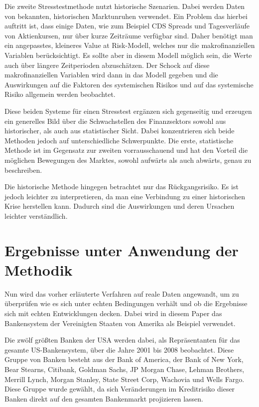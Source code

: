 \documentclass[a4paper,12pt]{scrartcl}
\begin{document}
Die zweite Stresstestmethode nutzt historische Szenarien. Dabei werden Daten von bekannten, historischen Marktunruhen verwendet. Ein Problem das hierbei auftritt ist, dass einige Daten, wie zum Beispiel CDS Spreads und Tagesverläufe von Aktienkursen, nur über kurze Zeiträume verfügbar sind. Daher benötigt man ein angepasstes, kleineres Value at Risk-Modell, welches nur die makrofinanziellen Variablen berücksichtigt. Es sollte aber in diesem Modell möglich sein, die Werte auch über längere Zeitperioden abzuschätzen.
Der Schock auf diese makrofinanziellen Variablen wird dann in das Modell gegeben und die Auswirkungen auf die Faktoren des systemischen Risikos und auf das systemische Risiko allgemein werden beobachtet.

Diese beiden Systeme für einen Stresstest ergänzen sich gegenseitig und erzeugen ein generelles Bild über die Schwachstellen des Finanzsektors sowohl aus historischer, als auch aus statistischer Sicht. Dabei konzentrieren sich beide Methoden jedoch auf unterschiedliche Schwerpunkte.
Die erste, statistische Methode ist im Gegensatz zur zweiten vorrausschauend und hat den Vorteil die möglichen Bewegungen des Marktes, sowohl aufwärts als auch abwärts, genau zu beschreiben. 

Die historische Methode hingegen betrachtet nur das Rückgangsrisiko. Es ist jedoch leichter zu interpretieren, da man eine Verbindung zu einer historischen Krise herstellen kann. Dadurch sind die Auswirkungen und deren Ursachen leichter verständlich.
\newpage

\section{Ergebnisse unter Anwendung der Methodik}
Nun wird das vorher erläuterte Verfahren auf reale Daten angewandt, um zu überprüfen wie es sich unter echten Bedingungen verhält und ob die Ergebnisse sich mit echten Entwicklungen decken. Dabei wird in diesem Paper das Bankensystem der Vereinigten Staaten von Amerika als Beispiel verwendet. 

Die zwölf größten Banken der USA werden dabei, als Repräsentanten für das gesamte US-Bankensystem, über die Jahre 2001 bis 2008 beobachtet. Diese Gruppe von Banken besteht aus der Bank of America, der Bank of New York, Bear Stearns, Citibank, Goldman Sachs, JP Morgan Chase, Lehman Brothers, Merrill Lynch, Morgan Stanley, State Street Corp, Wachovia und Wells Fargo. 
Diese Gruppe wurde gewählt, da sich Veränderungen im Kreditrisiko dieser Banken direkt auf den gesamten Bankenmarkt projizieren lassen.
\end{document}
